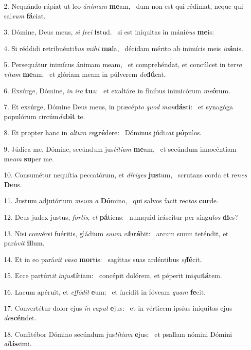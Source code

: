2. Nequándo rápiat ut leo \textit{á}\textit{ni}\textit{mam} \textbf{me}am, \ast\  dum non est qui rédimat, neque qui sal\textit{vum} \textbf{fá}ciat.\

3. Dómine, Deus meus, \textit{si} \textit{fe}\textit{ci} \textbf{is}tud. \ast\  si est iníquitas in máni\textit{bus} \textbf{me}is:\

4. Si réddidi retribuénti\textit{bus} \textit{mi}\textit{hi} \textbf{ma}la, \ast\  décidam mérito ab inimícis meis \textit{in}\textbf{á}nis.\

5. Persequátur inimícus ánimam meam, \dag\  et comprehéndat, et concúlcet in ter\textit{ra} \textit{vi}\textit{tam} \textbf{me}am, \ast\  et glóriam meam in púlverem \textit{de}\textbf{dú}cat.\

6. Exsúrge, Dómine, \textit{in} \textit{i}\textit{ra} \textbf{tu}a: \ast\  et exaltáre in fínibus inimicórum \textit{me}\textbf{ó}rum.\

7. Et exsúrge, Dómine Deus meus, in præcép\textit{to} \textit{quod} \textit{man}\textbf{dás}ti: \ast\  et synagóga populórum circúm\textit{da}\textbf{bit} te.\

8. Et propter hanc in \textit{al}\textit{tum} \textit{re}\textbf{gré}dere: \ast\  Dóminus júdi\textit{cat} \textbf{pó}pulos.\

9. Júdica me, Dómine, secúndum jus\textit{tí}\textit{ti}\textit{am} \textbf{me}am, \ast\  et secúndum innocéntiam me\textit{am} \textbf{su}per me.\

10. Consumétur nequítia peccatórum, et \textit{dí}\textit{ri}\textit{ges} \textbf{jus}tum, \ast\  scrutans corda et re\textit{nes} \textbf{De}us.\

11. Justum adjutórium \textit{me}\textit{um} \textit{a} \textbf{Dó}mino, \ast\  qui salvos facit rec\textit{tos} \textbf{cor}de.\

12. Deus judex justus, \textit{for}\textit{tis}, \textit{et} \textbf{pá}tiens: \ast\  numquid iráscitur per síngu\textit{los} \textbf{di}es?\

13. Nisi convérsi fuéritis, gládium \textit{su}\textit{um} \textit{vi}\textbf{brá}bit: \ast\  arcum suum teténdit, et pará\textit{vit} \textbf{il}lum.\

14. Et in eo pará\textit{vit} \textit{va}\textit{sa} \textbf{mor}tis: \ast\  sagíttas suas ardéntibus \textit{ef}\textbf{fé}cit.\

15. Ecce partúri\textit{it} \textit{in}\textit{jus}\textbf{tí}tiam: \ast\  concépit dolórem, et péperit ini\textit{qui}\textbf{tá}tem.\

16. Lacum apéruit, et \textit{ef}\textit{fó}\textit{dit} \textbf{e}um: \ast\  et íncidit in fóveam \textit{quam} \textbf{fe}cit.\

17. Convertétur dolor ejus \textit{in} \textit{ca}\textit{put} \textbf{e}jus: \ast\  et in vérticem ipsíus iníquitas ejus \textit{de}\textbf{scén}det.\

18. Confitébor Dómino secúndum jus\textit{tí}\textit{ti}\textit{am} \textbf{e}jus: \ast\  et psallam nómini Dómini \textit{al}\textbf{tís}simi.\

